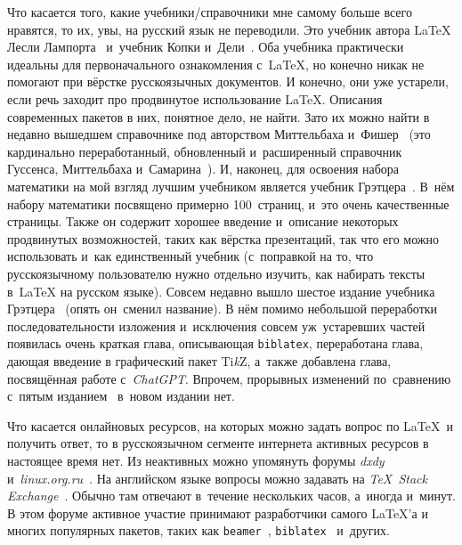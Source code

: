 \documentclass[a4paper,12pt,hyphens]{article}
\newcommand\softname[1]{\textit{#1}}
\newcommand\package[1]{\texttt{#1}}
\DeclareRobustCommand{\TikZ}{\textrm{Ti\textit{k}Z}}
\begin{document}
Что касается того, какие учебники/справочники мне самому больше всего нравятся, то их, увы, на русский язык не переводили. Это учебник автора \LaTeX{} Лесли Лампорта~\parencite{lamport:1994} и~учебник Копки и~Дели~\parencite{kopka-daly:2004}. Оба учебника практически идеальны для первоначального ознакомления с~\LaTeX, но конечно никак не помогают при вёрстке русскоязычных документов. И конечно, они уже устарели, если речь заходит про продвинутое использование \LaTeX. Описания современных пакетов в них, понятное дело, не найти. Зато их можно найти в недавно вышедшем справочнике под авторством Миттельбаха и~Фишер~\parencite{mittelbach-fischer:2023} (это кардинально переработанный, обновленный и~расширенный справочник Гуссенса, Миттельбаха и~Самарина~\parencite{gussens-mittelbach-samarin:1999}). И, наконец, для освоения набора математики на мой взгляд лучшим учебником является учебник Грэтцера~\parencite{gratzer:2016}. В~нём набору математики посвящено примерно 100~страниц, и~это очень качественные страницы. Также он содержит хорошее введение и~описание некоторых продвинутых возможностей, таких как вёрстка презентаций, так что его можно использовать и~как единственный учебник (с~поправкой на то, что русскоязычному пользователю нужно отдельно изучить, как набирать тексты в~\LaTeX{} на русском языке). Совсем недавно вышло шестое издание учебника Грэтцера~\parencite{gratzer:2024} (опять он~сменил название). В нём помимо небольшой переработки последовательности изложения и~исключения совсем уж~устаревших частей появилась очень краткая глава, описывающая \package{biblatex}, переработана глава, дающая введение в графический пакет \TikZ, а~также добавлена глава, посвящённая работе с~\softname{ChatGPT}. Впрочем, прорывных изменений по~сравнению с~пятым изданием~\parencite{gratzer:2016} в~новом издании нет.

Что касается онлайновых ресурсов, на которых можно задать вопрос по \LaTeX\ и получить ответ, то в русскоязычном сегменте интернета активных ресурсов в настоящее время нет. Из неактивных можно упомянуть форумы \softname{dxdy}~\parencite{site-dxdy} и~\softname{linux.org.ru}~\parencite{site-lor}. На английском языке вопросы можно задавать на \softname{\TeX\ Stack Exchange}~\parencite{site-tex-se}. Обычно там отвечают в~течение нескольких часов, а~иногда и~минут. В этом форуме активное участие принимают разработчики самого \LaTeX'а и многих популярных пакетов, таких как \package{beamer}~\parencite{ctan-beamer}, \package{biblatex}~\parencite{ctan-biblatex} и~других.
\end{document}
